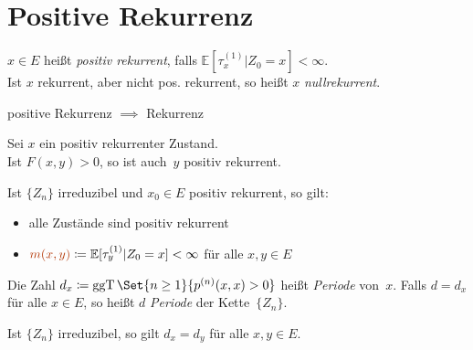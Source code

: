 \documentclass{cheat-sheet}
\newcommand{\E}{\mathbb{E}} %
\DeclareMathOperator{\ggT}{ggT} %
\newcommand{\Defn}[1]{\textcolor{DefinitionColor}{#1}}
\begin{document}

\section{Positive Rekurrenz}

\begin{defn}
  $x \in E$ heißt \emph{positiv rekurrent}, falls $\E [\tau_x^{(1)} | Z_0=x] < \infty$. \\
  Ist $x$ rekurrent, aber nicht pos. rekurrent, so heißt $x$ \emph{nullrekurrent}.
\end{defn}

\begin{bem}
  positive Rekurrenz $\implies$ Rekurrenz
\end{bem}

\begin{lem}
  \begin{minipage}[t]{0.8 \linewidth}
    Sei $x$ ein positiv rekurrenter Zustand. \\
    Ist $F(x, y) > 0$, so ist auch~$y$ positiv rekurrent.
  \end{minipage}
\end{lem}

\begin{kor}
  Ist $\{ Z_n \}$ irreduzibel und $x_0 \in E$ positiv rekurrent, so gilt:
  \begin{itemize}
    \item alle Zustände sind positiv rekurrent
    \item $\Defn{m(x, y)} \coloneqq \E[ \tau^{(1)}_y | Z_0 = x ] < \infty$ für alle $x, y \in E$
  \end{itemize}
\end{kor}

\begin{defn}
  Die Zahl
  $d_x \coloneqq \ggT \Set{n \geq 1}{p^{(n)}(x,x) > 0}$
  heißt \emph{Periode} von~$x$.
  Falls $d = d_x$ für alle $x \in E$, so heißt $d$ \textit{Periode} der Kette~$\{ Z_n \}$.
\end{defn}

\begin{lem}
  Ist $\{ Z_n \}$ irreduzibel, so gilt $d_x = d_y$ für alle $x, y \in E$.
\end{lem}
\end{document}
